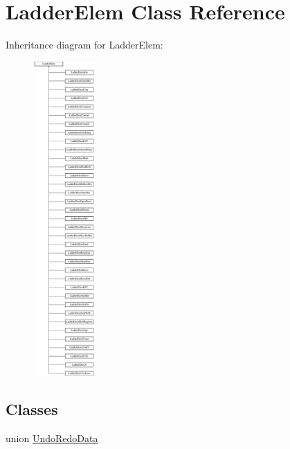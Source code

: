 \hypertarget{class_ladder_elem}{\section{Ladder\-Elem Class Reference}
\label{class_ladder_elem}
}
Inheritance diagram for Ladder\-Elem\-:\begin{figure}[H]
\begin{center}
\leavevmode
\includegraphics[height=12.000000cm]{class_ladder_elem}
\end{center}
\end{figure}
\subsection*{Classes}
\begin{DoxyCompactItemize}
\item 
union \hyperlink{union_ladder_elem_1_1_undo_redo_data}{Undo\-Redo\-Data}
\end{DoxyCompactItemize}
